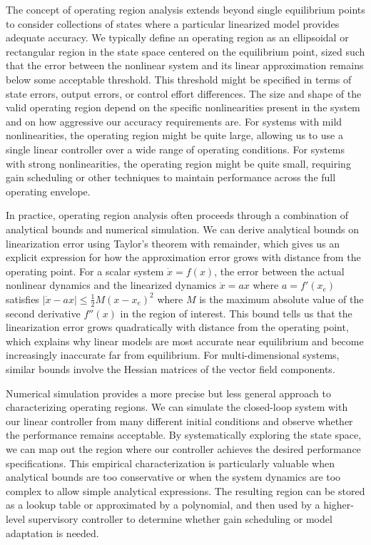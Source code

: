 The concept of operating region analysis extends beyond single equilibrium points to consider collections of states where a particular linearized model provides adequate accuracy. We typically define an operating region as an ellipsoidal or rectangular region in the state space centered on the equilibrium point, sized such that the error between the nonlinear system and its linear approximation remains below some acceptable threshold. This threshold might be specified in terms of state errors, output errors, or control effort differences. The size and shape of the valid operating region depend on the specific nonlinearities present in the system and on how aggressive our accuracy requirements are. For systems with mild nonlinearities, the operating region might be quite large, allowing us to use a single linear controller over a wide range of operating conditions. For systems with strong nonlinearities, the operating region might be quite small, requiring gain scheduling or other techniques to maintain performance across the full operating envelope.

In practice, operating region analysis often proceeds through a combination of analytical bounds and numerical simulation. We can derive analytical bounds on linearization error using Taylor's theorem with remainder, which gives us an explicit expression for how the approximation error grows with distance from the operating point. For a scalar system $\dot{x} = f(x)$, the error between the actual nonlinear dynamics and the linearized dynamics $\dot{x} = a x$ where $a = f'(x_e)$ satisfies $|\dot{x} - a x| \leq \frac{1}{2}M(x - x_e)^2$ where $M$ is the maximum absolute value of the second derivative $f''(x)$ in the region of interest. This bound tells us that the linearization error grows quadratically with distance from the operating point, which explains why linear models are most accurate near equilibrium and become increasingly inaccurate far from equilibrium. For multi-dimensional systems, similar bounds involve the Hessian matrices of the vector field components.

Numerical simulation provides a more precise but less general approach to characterizing operating regions. We can simulate the closed-loop system with our linear controller from many different initial conditions and observe whether the performance remains acceptable. By systematically exploring the state space, we can map out the region where our controller achieves the desired performance specifications. This empirical characterization is particularly valuable when analytical bounds are too conservative or when the system dynamics are too complex to allow simple analytical expressions. The resulting region can be stored as a lookup table or approximated by a polynomial, and then used by a higher-level supervisory controller to determine whether gain scheduling or model adaptation is needed.

